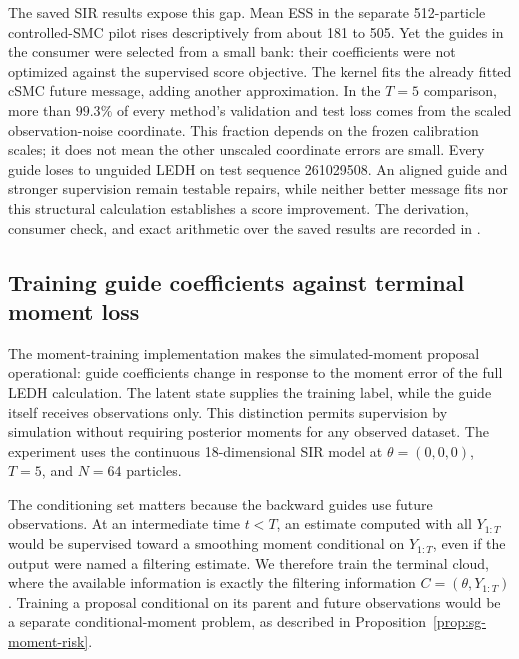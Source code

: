 The saved SIR results expose this gap. Mean ESS in the separate 512-particle
controlled-SMC pilot rises descriptively from about 181 to 505. Yet the
guides in the consumer were selected from a small bank: their coefficients
were not optimized against the supervised score objective. The kernel fits
the already fitted cSMC future message, adding another approximation. In
the $T=5$ comparison, more than $99.3\%$ of every method's validation and
test loss comes from the scaled observation-noise coordinate. This fraction
depends on the frozen calibration scales; it does not mean the other
unscaled coordinate errors are small. Every guide loses to unguided LEDH
on test sequence 261029508. An aligned guide and stronger supervision remain
testable repairs, while neither better message fits nor this structural
calculation establishes a score improvement. The derivation, consumer check,
and exact arithmetic over the saved results are recorded in
.

\subsection{Training guide coefficients against terminal moment loss}
\label{sec:sg-moment-training}

The moment-training implementation makes the simulated-moment proposal operational:
guide coefficients change in response to the moment error of the full LEDH
calculation. The latent state supplies the training label, while the guide
itself receives observations only. This distinction permits supervision by
simulation without requiring posterior moments for any observed dataset.
The experiment uses the continuous 18-dimensional SIR model at
$\theta=(0,0,0)$, $T=5$, and $N=64$ particles.

The conditioning set matters because the backward guides use future
observations. At an intermediate time $t<T$, an estimate computed with all
$Y_{1:T}$ would be supervised toward a smoothing moment conditional on
$Y_{1:T}$, even if the output were named a filtering estimate. We therefore
train the terminal cloud, where the available information is exactly the
filtering information $C=(\theta,Y_{1:T})$. Training a proposal conditional on
its parent and future observations would be a separate conditional-moment
problem, as described in Proposition~\ref{prop:sg-moment-risk}.

